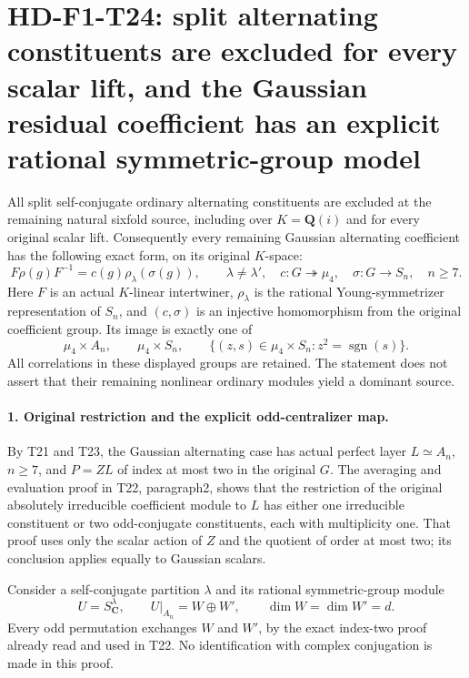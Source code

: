 \section[HD-F1-T24: exact Gaussian alternating coefficient models]{HD-F1-T24: split alternating constituents are excluded for every scalar lift, and the Gaussian residual coefficient has an explicit rational symmetric-group model}
\label{sec:f1-gaussian-alternating-coefficient}

All split self-conjugate ordinary alternating
constituents are excluded at the remaining natural
sixfold source, including over \(K=\mathbf Q(i)\)
and for every original scalar lift. Consequently
every remaining Gaussian alternating coefficient
has the following exact form, on its original
\(K\)-space:
\[
 F\rho(g)F^{-1}=c(g)\rho_\lambda(\sigma(g)),\qquad
 \lambda\ne\lambda',\quad
 c:G\twoheadrightarrow\mu_4,\quad
 \sigma:G\longrightarrow S_n,\quad n\ge7.
 \tag{F1T24.1}
\]
Here \(F\) is an actual \(K\)-linear intertwiner,
\(\rho_\lambda\) is the rational
Young-symmetrizer representation of \(S_n\),
and \((c,\sigma)\) is an injective homomorphism
from the original coefficient group. Its image is
exactly one of
\[
 \mu_4\times A_n,\qquad \mu_4\times S_n,
 \qquad
 \{(z,s)\in\mu_4\times S_n:z^2=\operatorname{sgn}(s)\}.
 \tag{F1T24.2}
\]
All correlations in these displayed groups are retained.
The statement does not assert that their remaining
nonlinear ordinary modules yield a dominant source.

\paragraph{1. Original restriction and the explicit odd-centralizer map.}
By T21 and T23, the Gaussian alternating case has
actual perfect layer \(L\simeq A_n\), \(n\ge7\),
and \(P=ZL\) of index at most two in the original
\(G\). The averaging and evaluation proof in
T22, paragraph2, shows that the restriction of the
original absolutely irreducible coefficient module
to \(L\) has either one irreducible constituent
or two odd-conjugate constituents, each with
multiplicity one. That proof uses only the scalar
action of \(Z\) and the quotient of order at most
two; its conclusion applies equally to Gaussian
scalars.

Consider a self-conjugate partition \(\lambda\)
and its rational symmetric-group module
\[
 U=S^\lambda_{\mathbf C},\qquad
 U|_{A_n}=W\oplus W',\qquad
 \dim W=\dim W'=d.
 \tag{F1T24.3}
\]
Every odd permutation exchanges \(W\) and \(W'\),
by the exact index-two proof already read and used
in T22. No identification with complex conjugation
is made in this proof.

